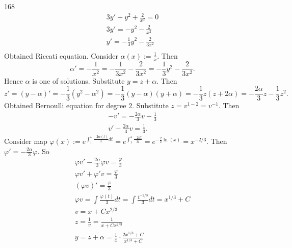 \documentclass[12pt,a4paper]{article}
\begin{document}
    \begin{problem}{168}
        \begin{gather*}
            3y' + y^2 + \frac{2}{x^2} = 0\\
            3y' = - y^2 - \frac{2}{x^2}\\
            y' = - \frac{1}{3} y^2 - \frac{2}{3 x^2}\\
        \end{gather*}
        Obtained Riccati equation. Consider $\alpha(x) := \frac{1}{x}$. Then
        \[\alpha' = -\frac{1}{x^2} = - \frac{1}{3x^2} - \frac{2}{3x^2} = -\frac{1}{3} y^2 - \frac{2}{3x^2}.\]
        Hence $\alpha$ is one of solutions. Substitute $y = z + \alpha$. Then
        \[z' = (y-\alpha)' = -\frac{1}{3}(y^2 - \alpha^2) = -\frac{1}{3}(y - \alpha)(y + \alpha) = -\frac{1}{3}z(z + 2\alpha) = -\frac{2\alpha}{3} z - \frac{1}{3} z^2.\]
        Obtained Bernoulli equation for degree $2$. Substitute $z = v^{1-2} = v^{-1}$. Then
        \begin{gather*}
            -v' = -\frac{2\alpha}{3}v - \frac{1}{3}\\
            v' - \frac{2\alpha}{3} v = \frac{1}{3}.
        \end{gather*}
        Consider map $\varphi(x) := e^{\int_1^x \frac{-2\alpha(t)}{3} dt} = e^{\int_1^x \frac{-2dt}{3t}} = e^{-\frac{2}{3}\ln(x)} = x^{-2/3}$. Then $\varphi' = -\frac{2\alpha}{3} \varphi$. So
        \begin{gather*}
            \varphi v' - \frac{2\alpha}{3} \varphi v = \frac{\varphi}{3}\\
            \varphi v' + \varphi' v = \frac{\varphi}{3}\\
            (\varphi v)' = \frac{\varphi}{3}\\
            \varphi v = \int \frac{\varphi(t)}{3} dt = \int \frac{t^{-2/3}}{3} dt = x^{1/3} + C\\
            v = x + C x^{2/3}\\
            z = \frac{1}{v} = \frac{1}{x + C x^{2/3}}\\
            y = z + \alpha = \frac{1}{x} \cdot \frac{2 x^{1/3} + C}{x^{1/3} + C}\\
        \end{gather*}
    \end{problem}
\end{document}
